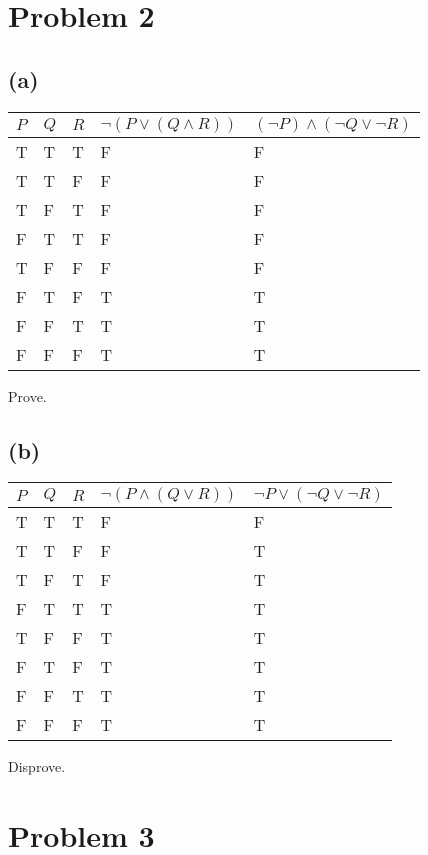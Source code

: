 \documentclass[12pt]{article}
\begin{document}
\section*{Problem 2}
\subsection*{(a)}
\begin{center}
\begin{tabular}{lllll}
    \toprule
    $P$ & $Q$ & $R$ & $\neg\left( P \lor \left( Q \land R \right)  \right)$ & $\left( \neg P \right)\land \left( \neg Q\lor \neg R \right)  $ \\
    \midrule
    T & T & T & F & F\\
    T & T & F & F & F\\
    T & F & T & F & F\\
    F & T & T & F & F\\
    T & F & F & F & F\\
    F & T & F & T & T\\
    F & F & T & T & T\\
    F & F & F & T & T\\
    \bottomrule
\end{tabular}
\end{center}
Prove.

\subsection*{(b)}
\begin{center}
\begin{tabular}{lllll}
    \toprule
    $P$ & $Q$ & $R$ & $\neg \left( P \land \left( Q \lor R \right)  \right) $ & $\neg P \lor \left( \neg Q \lor \neg R \right) $\\
    \midrule
    T & T & T & F & F\\
    T & T & F & F & T\\
    T & F & T & F & T\\
    F & T & T & T & T\\
    T & F & F & T & T\\
    F & T & F & T & T\\
    F & F & T & T & T\\
    F & F & F & T & T\\
    \bottomrule
\end{tabular}
\end{center}
Disprove.

\section*{Problem 3}
\end{document}
